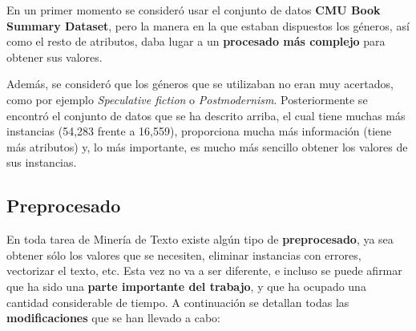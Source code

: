 \documentclass[12pt,a4paper, xcolor=table]{article}
\begin{document}
    \vspace{3mm}

    En un primer momento se consideró usar el conjunto de datos \textbf{CMU Book Summary Dataset}\cite{cmu}, pero la manera en la que estaban dispuestos los géneros, así como el resto de atributos, daba lugar a un \textbf{procesado más complejo} para obtener sus valores.

    \vspace{1mm}

    Además, se consideró que los géneros que se utilizaban no eran muy acertados, como por ejemplo \textit{Speculative fiction} o \textit{Postmodernism}. Posteriormente se encontró el conjunto de datos que se ha descrito arriba, el cual tiene muchas más instancias (54,283 frente a 16,559), proporciona mucha más información (tiene más atributos) y, lo más importante, es mucho más sencillo obtener los valores de sus instancias.

    \subsection{Preprocesado}
        En toda tarea de Minería de Texto existe algún tipo de \textbf{preprocesado}, ya sea obtener sólo los valores que se necesiten, eliminar instancias con errores, vectorizar el texto, etc. Esta vez no va a ser diferente, e incluso se puede afirmar que ha sido una \textbf{parte importante del trabajo}, y que ha ocupado una cantidad considerable de tiempo. A continuación se detallan todas las \textbf{modificaciones} que se han llevado a cabo:
\end{document}
